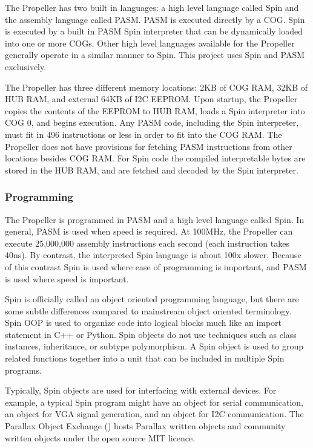 \documentclass{article}
\numberwithin{equation}{section} %
\begin{document}
The Propeller has two built in languages: a high level language called Spin and the assembly language called PASM. PASM is executed directly by a COG. Spin is executed by a built in PASM Spin interpreter that can be dynamically loaded into one or more COGs. Other high level languages available for the Propeller generally operate in a similar manner to Spin. This project uses Spin and PASM exclusively.

The Propeller has three different memory locations: 2KB of COG RAM, 32KB of HUB RAM, and external 64KB of I2C EEPROM. Upon startup, the Propeller copies the contents of the EEPROM to HUB RAM, loads a Spin interpreter into COG 0, and begins execution.  Any PASM code, including the Spin interpreter, must fit in 496 instructions or less in order to fit into the COG RAM. The Propeller does not have provisions for fetching PASM instructions from other locations besides COG RAM. For Spin code the compiled interpretable bytes are stored in the HUB RAM, and are fetched and decoded by the Spin interpreter.

\subsubsection{Programming}

The Propeller is programmed in PASM and a high level language called Spin. In general, PASM is used when speed is required. At 100MHz, the Propeller can execute 25,000,000 assembly instructions each second (each instruction takes 40ns). By contrast, the interpreted Spin language is about 100x slower. Because of this contrast Spin is used where ease of programming is important, and PASM is used where speed is important.

Spin is officially called an object oriented programming language, but there are some subtle differences compared to mainstream object oriented terminology. Spin OOP is used to organize code into logical blocks much like an import statement in C++ or Python. Spin objects do not use techniques such as class instances, inheritance, or subtype polymorphism. A Spin object is used to group related functions together into a unit that can be included in multiple Spin programs. 

Typically, Spin objects are used for interfacing with external devices. For example, a typical Spin program might have an object for serial communication, an object for VGA signal generation, and an object for I2C communication. The Parallax Object Exchange (\cite{parallaxobjectexchange}) hosts Parallax written objects and community written objects under the open source MIT licence.
\end{document}
